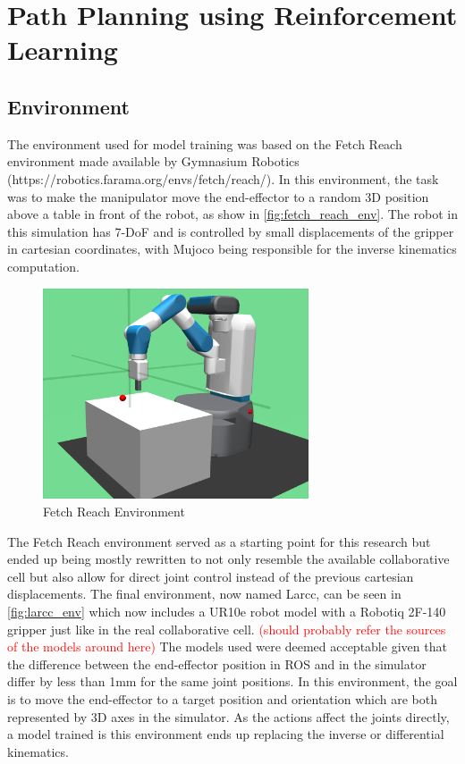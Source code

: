 \section{Path Planning using Reinforcement Learning}

\subsection{Environment}

The environment used for model training was based on the Fetch Reach environment made available by Gymnasium Robotics (https://robotics.farama.org/envs/fetch/reach/). In this environment, the task was to make the manipulator move the end-effector to a random 3D position above a table in front of the robot, as show in \autoref{fig:fetch_reach_env}. The robot in this simulation has 7-DoF and is controlled by small displacements of the gripper in cartesian coordinates, with Mujoco being responsible for the inverse kinematics computation.

\begin{figure}[H]%
    \centerline{\includegraphics[width=0.7\textwidth]{figs/fetch_reach.png}}
    \caption[Fetch Reach Environment]{Fetch Reach Environment}
    \label{fig:fetch_reach_env}
\end{figure}

The Fetch Reach environment served as a starting point for this research but ended up being mostly rewritten to not only resemble the available collaborative cell but also allow for direct joint control instead of the previous cartesian displacements. The final environment, now named Larcc, can be seen in \autoref{fig:larcc_env} which now includes a UR10e robot model with a Robotiq 2F-140 gripper just like in the real collaborative cell. \textcolor{red}{(should probably refer the sources of the models around here)} The models used were deemed acceptable given that the difference between the end-effector position in ROS and in the simulator differ by less than 1mm for the same joint positions. In this environment, the goal is to move the end-effector to a target position and orientation which are both represented by 3D axes in the simulator. As the actions affect the joints directly, a model trained is this environment ends up replacing the inverse or differential kinematics.

